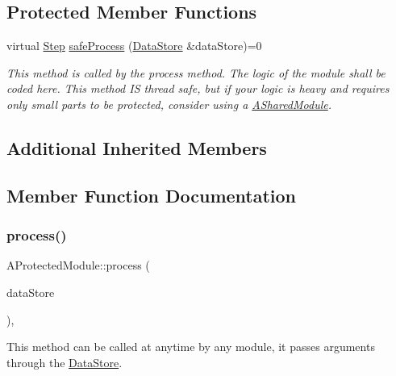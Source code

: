 \subsection*{Protected Member Functions}
\begin{DoxyCompactItemize}
\item 
virtual \mbox{\hyperlink{Step_8hpp_a58ad1bb906913f90b95697c49f198770}{Step}} \mbox{\hyperlink{classxzia_1_1AProtectedModule_a0f4b1e0c087fb98bdab0abe1e8205be0}{safe\+Process}} (\mbox{\hyperlink{classxzia_1_1DataStore}{Data\+Store}} \&data\+Store)=0
\begin{DoxyCompactList}\small\item\em This method is called by the process method. The logic of the module shall be coded here. This method IS thread safe, but if your logic is heavy and requires only small parts to be protected, consider using a \mbox{\hyperlink{classxzia_1_1ASharedModule}{A\+Shared\+Module}}. \end{DoxyCompactList}\end{DoxyCompactItemize}
\subsection*{Additional Inherited Members}


\subsection{Member Function Documentation}
\mbox{\label{classxzia_1_1AProtectedModule_af8724b0d37b80ed8799c9f6b31dcdc2f}} 
\subsubsection{\texorpdfstring{process()}{process()}}
{\footnotesize\ttfamily A\+Protected\+Module\+::process (\begin{DoxyParamCaption}\item[{\mbox{\hyperlink{classxzia_1_1DataStore}{xzia\+::\+Data\+Store}} \&}]{data\+Store }\end{DoxyParamCaption})\hspace{0.3cm}{\ttfamily [final]}, {\ttfamily [virtual]}}



This method can be called at anytime by any module, it passes arguments through the \mbox{\hyperlink{classxzia_1_1DataStore}{Data\+Store}}. 


